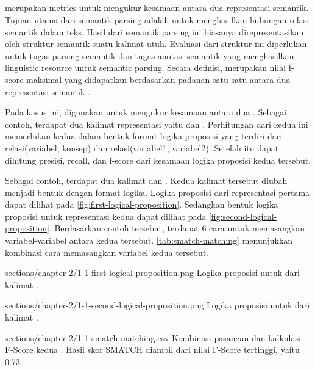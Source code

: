 \subsection{}

\SMATCH{} merupakan metrics untuk mengukur kesamaan antara dua representasi semantik.
Tujuan utama dari semantik parsing adalah untuk menghasilkan hubungan relasi semantik dalam teks.
Hasil dari semantik parsing ini biasanya direpresentasikan oleh struktur semantik suatu kalimat utuh.
Evaluasi dari struktur ini diperlukan untuk tugas parsing semantik dan tugas anotasi semantik yang menghasilkan linguistic resource untuk semantic parsing.
Secara definisi, \SMATCH{} merupakan nilai f-score maksimal yang didapatkan berdasarkan padanan satu-satu antara dua representasi semantik .

Pada kasus ini, \SMATCH{} digunakan untuk mengukur kesamaan antara dua \AMR{}.
Sebagai contoh, terdapat dua kalimat representasi \AMR{} yaitu  dan .
Perhitungan \SMATCH{} dari kedua \AMR{} ini memerlukan kedua \AMR{} dalam bentuk format logika proposisi yang terdiri dari relasi(variabel, konsep) dan relasi(variabel1, variabel2).
Setelah itu dapat dihitung presisi, recall, dan f-score dari kesamaan logika proposisi kedua \AMR{} tersebut.

Sebagai contoh, terdapat dua kalimat  dan .
Kedua kalimat tersebut diubah menjadi bentuk \AMR{} dengan format logika.
Logika proposisi dari representasi \AMR{} pertama dapat dilihat pada \cref{fig:first-logical-proposition}.
Sedangkan bentuk logika proposisi untuk representasi kedua dapat dilihat pada \cref{fig:second-logical-proposition}.
Berdasarkan contoh tersebut, terdapat 6 cara untuk memasangkan variabel-variabel antara kedua \AMR{} tersebut.
\cref{tab:smatch-matching} menunjukkan kombinasi cara memasangkan variabel kedua \AMR{} tersebut.

  {sections/chapter-2/1-1-first-logical-proposition.png}
  {Logika proposisi untuk \AMR{} dari kalimat .}

  {sections/chapter-2/1-1-second-logical-proposition.png}
  {Logika proposisi untuk \AMR{} dari kalimat .}

  {sections/chapter-2/1-1-smatch-matching.csv}
  {
    Kombinasi pasangan dan kalkulasi F-Score kedua \AMR{} .
    Hasil skor SMATCH diambil dari nilai F-Score tertinggi, yaitu 0.73.
  }

